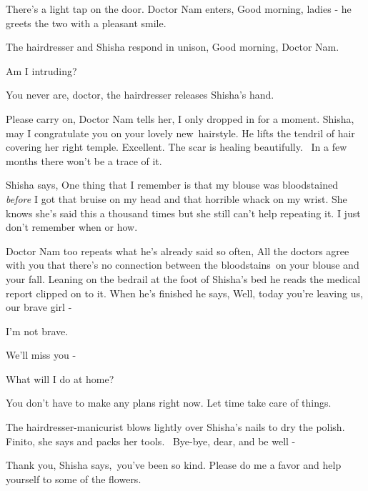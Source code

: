 \documentclass[letterpaper]{article}
\begin{document}
There's a light tap on the door. Doctor Nam enters, {\textquotedbl}Good morning, ladies -{\textquotedbl} he greets the
two with a pleasant smile.

The hairdresser and Shisha respond in unison, {\textquotedbl}Good morning, Doctor Nam.{\textquotedbl} 

{\textquotedbl}Am I intruding?{\textquotedbl} 

{\textquotedbl}You never are, doctor,{\textquotedbl} the hairdresser releases Shisha's hand. 

{\textquotedbl}Please carry on,{\textquotedbl} Doctor Nam tells her, {\textquotedbl}I only dropped in for a moment.
Shisha, may I congratulate you on your lovely new~hairstyle.{\textquotedbl} He lifts the tendril of hair covering her
right temple. {\textquotedbl}Excellent. The scar is healing beautifully. ~In a few months there won't be a trace of
it.{\textquotedbl} 

Shisha says, {\textquotedbl}One thing that I remember is that my blouse was bloodstained \textit{before} I got that
bruise on my head and that horrible whack on my wrist.{\textquotedbl} She knows she's said this a thousand times but
she still can't help repeating it. {\textquotedbl}I just don't remember when or how.{\textquotedbl} 

Doctor Nam too repeats what he's already said so often, {\textquotedbl}All the doctors agree with you that there's no
connection between the bloodstains~on your blouse and your fall.{\textquotedbl} Leaning on the bedrail at the foot of
Shisha's bed he reads the medical report clipped on to it. When he's finished he says, {\textquotedbl}Well, today
you're leaving us, our brave girl -{\textquotedbl} 

{\textquotedbl}I'm not brave.{\textquotedbl} 

{\textquotedbl}We'll miss you -{\textquotedbl} 

{\textquotedbl}What will I do at home?{\textquotedbl} 

{\textquotedbl}You don't have to make any plans right now. Let time take care of things.{\textquotedbl} 

The hairdresser-manicurist blows lightly over Shisha's nails to dry the polish. {\textquotedbl}Finito,{\textquotedbl}
she says and packs her tools. ~{\textquotedbl}Bye-bye, dear, and be well -{\textquotedbl} ~

{\textquotedbl}Thank you,{\textquotedbl} Shisha says,~{\textquotedbl}you've been so kind. Please do me a favor and help
yourself to some of the flowers.{\textquotedbl} 
\end{document}
